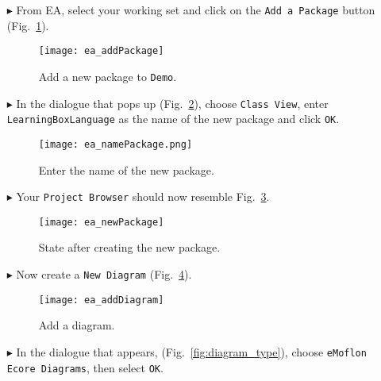 \newpage
\begin{itemize}
\item[$\blacktriangleright$] From EA, select your working set and click on the \texttt{Add a Package} button (Fig.~\ref{fig:new_package}).

\begin{figure}[htbp]
	\centering
  \texttt{[image: ea\_addPackage]}
	\caption{Add a new package to \texttt{Demo}.}
	\label{fig:new_package}
	\vspace{0.5cm}
\end{figure}

\vspace{0.5cm}

\item[$\blacktriangleright$] In the dialogue that pops up (Fig.~\ref{fig:new_package_name}), choose \texttt{Class View}, enter \texttt{Learning\-Box\-Language}
as the name of the new package and click \texttt{OK}.

\begin{figure}[htbp]
	\centering
    \texttt{[image: ea\_namePackage.png]}
	\caption{Enter the name of the new package.}
	\label{fig:new_package_name}
\end{figure}
\FloatBarrier

\vspace{0.5cm}

\item[$\blacktriangleright$] Your \texttt{Project Browser} should now resemble Fig.~\ref{fig:new_package_completed}.

\begin{figure}[htbp]
	\centering
  \texttt{[image: ea\_newPackage]}
	\caption{State after creating the new package.}
	\label{fig:new_package_completed}
\end{figure}
\FloatBarrier

\clearpage
\item[$\blacktriangleright$] Now create a \texttt{New Diagram} (Fig.~\ref{fig:diagram}).

\begin{figure}[htbp]
	\centering
  \texttt{[image: ea\_addDiagram]}
	\caption{Add a diagram.}
	\label{fig:diagram}
\end{figure}
\FloatBarrier

\item[$\blacktriangleright$] In the dialogue that appears, (Fig.~\ref{fig:diagram_type}), choose \texttt{eMoflon Ecore Diagrams}, then select \texttt{OK}.


\end{itemize}
